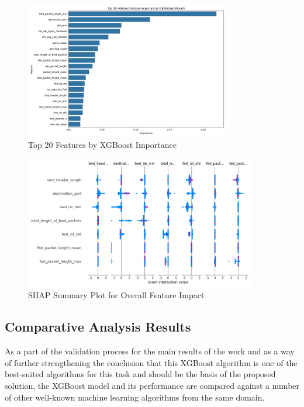 \begin{figure}[H]
	\centering
	\includegraphics[width=0.8\textwidth]{assets/figures/results/xgboost_feature_importance.png}
	\caption{Top 20 Features by XGBoost Importance}
	\label{fig:xgboost_feature_importance}
\end{figure}

\begin{figure}[H]
	\centering
	\includegraphics[width=0.9\textwidth]{assets/figures/results/shap_summary_plot_overall.png}
	\caption{SHAP Summary Plot for Overall Feature Impact}
	\label{fig:shap_summary_plot}
\end{figure}

\subsection{Comparative Analysis Results}

As a part of the validation process for the main results of the work and as a way of further strengthening the conclusion that this XGBoost algorithm is one of the best-suited algorithms for this task and should be the basis of the proposed solution, the XGBoost model and its performance are compared against a number of other well-known machine learning algorithms from the same domain.

